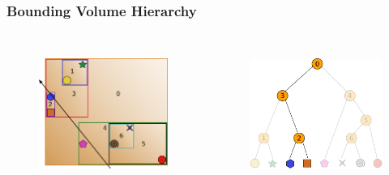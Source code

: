 \documentclass{beamer}
\begin{document}
\begin{frame}
  \frametitle{Bounding Volume Hierarchy}
  
\begin{columns}[t]

\begin{figure}
\includegraphics[height=45mm]{primitive-box-ray.png}
\end{figure}

\begin{figure}
\includegraphics[height=45mm]{elim_1.png}
\end{figure}
\end{columns}
\end{frame}
\end{document}
